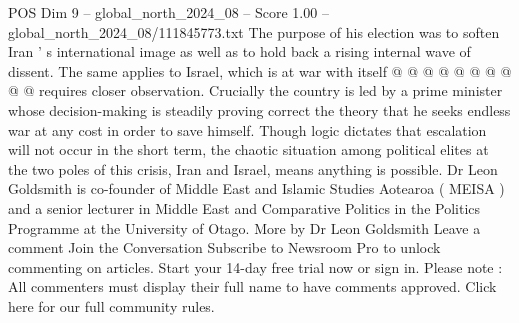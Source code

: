 \begin{textsample}{POS Dim 9 – global\_north\_2024\_08 – Score 1.00 – global\_north\_2024\_08/111845773.txt}
The purpose of his election was to soften Iran ' s international image as well as to hold back a rising internal wave of dissent.
The same applies to Israel, which is at war with itself @ @ @ @ @ @ @ @ @ @ requires closer observation.
Crucially the country is led by a prime minister whose decision-making is steadily proving correct the theory that he seeks endless war at any cost in order to save himself.
Though logic dictates that escalation will not occur in the short term, the chaotic situation among political elites at the two poles of this crisis, Iran and Israel, means anything is possible.
Dr Leon Goldsmith is co-founder of Middle East and Islamic Studies Aotearoa ( MEISA ) and a senior lecturer in Middle East and Comparative Politics in the Politics Programme at the University of Otago.
More by Dr Leon Goldsmith Leave a comment Join the Conversation Subscribe to Newsroom Pro to unlock commenting on articles.
Start your 14-day free trial now or sign in.
Please note : All commenters must display their full name to have comments approved.
Click here for our full community rules.

\end{textsample}
